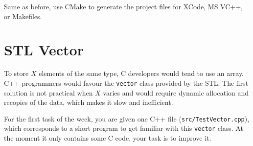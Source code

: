 Same as before, use CMake to generate the project files for XCode, MS VC++, or Makefiles. 

\section{STL Vector}

To store $X$ elements of the same type,
C developers would tend to use an array. 
C++ programmers would favour the \verb+vector+ class provided by the STL. 
The first solution is not practical when $X$ varies and would require dynamic allocation and recopies of the data, which makes it slow and inefficient. 

For the first task of the week, you are given one C++ file (\verb+src/TestVector.cpp+), which corresponds to a short program to get familiar with this \verb+vector+ class. At the moment it only contains some C code, your task is to improve it. 

